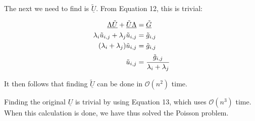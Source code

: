 The next we need to find is $\underline{\tilde{U}}$. From Equation 12, this is
trivial:

\begin{align*}
  \underline {\Lambda \tilde{U}} + \underline {\tilde{U} \Lambda} &=
  \underline{\tilde{G}}\\
  \lambda_i\tilde{u}_{i,j} + \lambda_j\tilde{u}_{i,j} &= \tilde{g}_{i,j} \\
  (\lambda_i + \lambda_j)\tilde{u}_{i,j} &= \tilde{g}_{i,j} \\
  \tilde{u}_{i,j} &= \cfrac{\tilde{g}_{i,j}}{\lambda_i + \lambda_j}
\end{align*}

It then follows that finding $\underline{\tilde{U}}$ can be done in
$\mathcal{O}(n^2)$ time.

Finding the original $\underline U$ is trivial by using Equation 13, which uses
$\mathcal{O}(n^3)$ time. When this calculation is done, we have thus solved the
Poisson problem.
